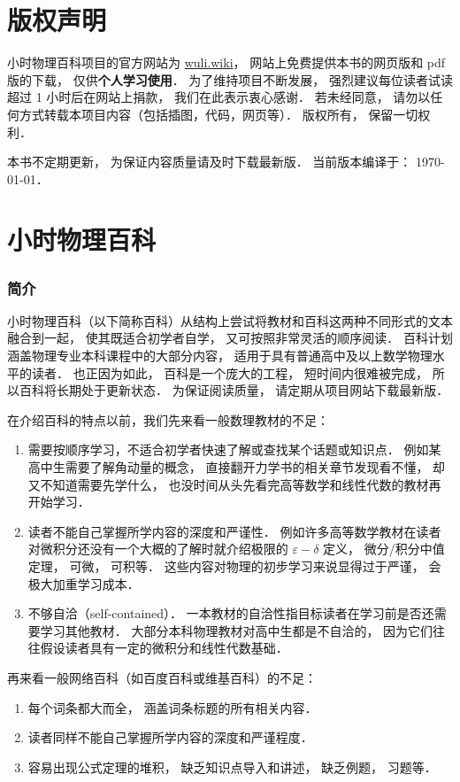
\chapter*{版权声明}

小时物理百科项目的官方网站为 \href{http://wuli.wiki}{wuli.wiki}， 网站上免费提供本书的网页版和 pdf 版的下载， 仅供\textbf{个人学习使用}． 为了维持项目不断发展， 强烈建议每位读者试读超过 1 小时后在网站上捐款， 我们在此表示衷心感谢． 若未经同意， 请勿以任何方式转载本项目内容（包括插图，代码，网页等）． 版权所有， 保留一切权利．

本书不定期更新， 为保证内容质量请及时下载最新版． 当前版本编译于： \today．

\chapter*{小时物理百科}

\subsection{简介}

小时物理百科（以下简称百科）从结构上尝试将教材和百科这两种不同形式的文本融合到一起， 使其既适合初学者自学， 又可按照非常灵活的顺序阅读． 百科计划涵盖物理专业本科课程中的大部分内容， 适用于具有普通高中及以上数学物理水平的读者． 也正因为如此， 百科是一个庞大的工程， 短时间内很难被完成， 所以百科将长期处于更新状态． 为保证阅读质量， 请定期从项目网站下载最新版．

在介绍百科的特点以前，我们先来看一般数理教材的不足：
\begin{enumerate}
\item 需要按顺序学习，不适合初学者快速了解或查找某个话题或知识点． 例如某高中生需要了解角动量的概念， 直接翻开力学书的相关章节发现看不懂， 却又不知道需要先学什么， 也没时间从头先看完高等数学和线性代数的教材再开始学习．
\item 读者不能自己掌握所学内容的深度和严谨性． 例如许多高等数学教材在读者对微积分还没有一个大概的了解时就介绍极限的 $\varepsilon-\delta$ 定义， 微分/积分中值定理， 可微， 可积等． 这些内容对物理的初步学习来说显得过于严谨， 会极大加重学习成本．
\item 不够自洽（self-contained）． 一本教材的自洽性指目标读者在学习前是否还需要学习其他教材． 大部分本科物理教材对高中生都是不自洽的， 因为它们往往假设读者具有一定的微积分和线性代数基础．
\end{enumerate}

再来看一般网络百科（如百度百科或维基百科）的不足：
\begin{enumerate}
\item 每个词条都大而全， 涵盖词条标题的所有相关内容．
\item 读者同样不能自己掌握所学内容的深度和严谨程度．
\item 容易出现公式定理的堆积， 缺乏知识点导入和讲述， 缺乏例题， 习题等．
\end{enumerate}

